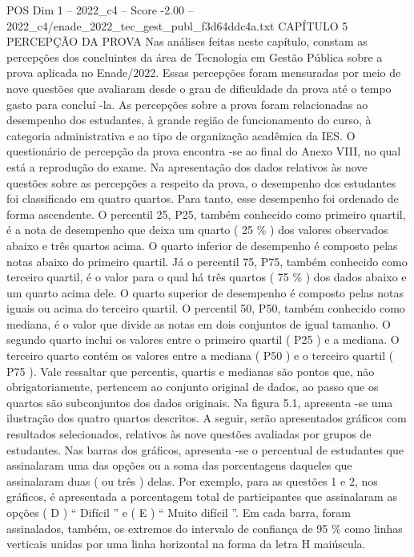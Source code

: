 \begin{textsample}{POS Dim 1 – 2022\_c4 – Score -2.00 – 2022\_c4/enade\_2022\_tec\_gest\_publ\_f3d64ddc4a.txt}  \label{ex:f1_pos_253}
CAPÍTULO 5 PERCEPÇÃO DA PROVA Nas análises feitas neste capítulo, constam as percepções dos concluintes da área de Tecnologia em Gestão Pública sobre a prova aplicada no Enade/2022.
Essas percepções foram mensuradas por meio de nove questões que avaliaram desde o grau de dificuldade da prova até o tempo gasto para concluí -la.
As percepções sobre a prova foram relacionadas ao desempenho dos estudantes, à grande região de funcionamento do curso, à categoria administrativa e ao tipo de organização acadêmica da IES.
O questionário de percepção da prova encontra -se ao final do Anexo VIII, no qual está a reprodução do exame.
Na apresentação dos dados relativos às nove questões sobre as percepções a respeito da prova, o desempenho dos estudantes foi classificado em quatro quartos.
Para tanto, esse desempenho foi ordenado de forma ascendente.
O percentil 25, P25, também conhecido como primeiro quartil, é a nota de desempenho que deixa um quarto ( 25 \% ) dos valores observados abaixo e três quartos acima.
O quarto inferior de desempenho é composto pelas notas abaixo do primeiro quartil.
Já o percentil 75, P75, também conhecido como terceiro quartil, é o valor para o qual há três quartos ( 75 \% ) dos dados abaixo e um quarto acima dele.
O quarto superior de desempenho é composto pelas notas iguais ou acima do terceiro quartil.
O percentil 50, P50, também conhecido como mediana, é o valor que divide as notas em dois conjuntos de igual tamanho.
O segundo quarto inclui os valores entre o primeiro quartil ( P25 ) e a mediana.
O terceiro quarto contém os valores entre a mediana ( P50 ) e o terceiro quartil ( P75 ).
Vale ressaltar que percentis, quartis e medianas são pontos que, não obrigatoriamente, pertencem ao conjunto original de dados, ao passo que os quartos são subconjuntos dos dados originais.
Na figura 5.1, apresenta -se uma ilustração dos quatro quartos descritos.
A seguir, serão apresentados gráficos com resultados selecionados, relativos às nove questões avaliadas por grupos de estudantes.
Nas barras dos gráficos, apresenta -se o percentual de estudantes que assinalaram uma das opções ou a soma das porcentagens daqueles que assinalaram duas ( ou três ) delas.
Por exemplo, para as questões 1 e 2, nos gráficos, é apresentada a porcentagem total de participantes que assinalaram as opções ( D ) “ Difícil ” e ( E ) “ Muito difícil ”.
Em cada barra, foram assinalados, também, os extremos do intervalo de confiança de 95 \% como linhas verticais unidas por uma linha horizontal na forma da letra H maiúscula.

\end{textsample}
